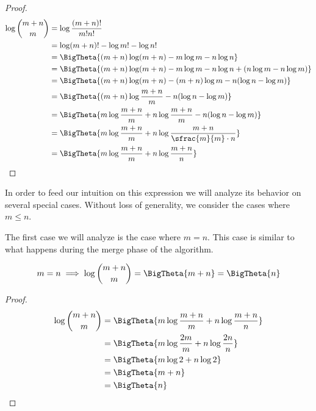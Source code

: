 \begin{proof}
\begin{align*}
\log\binom{m+n}{m} &= \log\frac{(m+n)!}{m!n!}\\
&= \log(m+n)! - \log m! - \log n!\\
&= \BigTheta{(m+n) \log(m+n) - m \log m - n \log n}\\
&= \BigTheta{(m+n) \log(m+n) - m \log m - n \log n + (n \log m - n \log m)}\\
&= \BigTheta{(m+n) \log(m+n) - (m+n) \log m - n (\log n - \log m)}\\
&= \BigTheta{(m+n) \log\frac{m+n}{m} - n (\log n - \log m)}\\
&= \BigTheta{m \log\frac{m+n}{m} + n \log\frac{m+n}{m} - n (\log n - \log m)}\\
&= \BigTheta{m \log\frac{m+n}{m} + n \log\frac{m+n}{\sfrac{m}{m} \cdot n}}\\
&= \BigTheta{m \log\frac{m+n}{m} + n \log\frac{m+n}{n}}\\
\end{align*}
\end{proof}

In order to feed our intuition on this expression we will analyze its behavior
on several special cases. Without loss of generality, we consider the cases
where \(m \leq n\).

The first case we will analyze is the case where $m = n$. This case is similar
to what happens during the merge phase of the \mergesort algorithm.

\begin{lemma}
\begin{align*}
m = n &\implies \log\binom{m+n}{m} = \BigTheta{m + n} = \BigTheta{n}\\
\end{align*}
\end{lemma}

\begin{proof}
\begin{align*}
\log\binom{m+n}{m} &= \BigTheta{m \log\frac{m+n}{m} + n \log\frac{m+n}{n}}\\
&= \BigTheta{m \log\frac{2m}{m} + n \log\frac{2n}{n}}\\
&= \BigTheta{m \log 2 + n \log 2}\\
&= \BigTheta{m + n}\\
&= \BigTheta{n}\\
\end{align*}
\end{proof}

